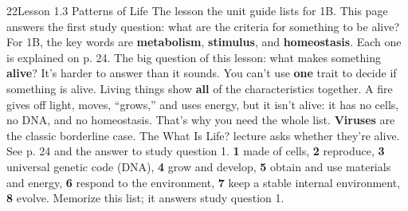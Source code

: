 \documentclass[11pt,letterpaper]{article}
\begin{document}
\clearpage


\begin{tbpage}{22}{Lesson 1.3 Patterns of Life}
  {The lesson the unit guide lists for 1B. This page answers the first study question: what are the criteria for something to be alive?}
    {For 1B, the key words are \textbf{metabolism}, \textbf{stimulus}, and \textbf{homeostasis}. Each one is explained on p. 24.}
    {The big question of this lesson: what makes something \textbf{alive}? It's harder to answer than it sounds.}
    {You can't use \textbf{one} trait to decide if something is alive. Living things show \textbf{all} of the characteristics together.}
    {A fire gives off light, moves, ``grows,'' and uses energy, but it isn't alive: it has no cells, no DNA, and no homeostasis. That's why you need the whole list.}
    {\textbf{Viruses} are the classic borderline case. The What Is Life? lecture asks whether they're alive. See p. 24 and the answer to study question 1.}
    {\textbf{1} made of cells, \textbf{2} reproduce, \textbf{3} universal genetic code (DNA), \textbf{4} grow and develop, \textbf{5} obtain and use materials and energy, \textbf{6} respond to the environment, \textbf{7} keep a stable internal environment, \textbf{8} evolve. Memorize this list; it answers study question 1.}
\end{tbpage}
\end{document}
